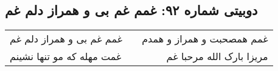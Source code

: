 \begin{center}
\section*{دوبیتی شماره ۹۲: غمم غم بی و همراز دلم غم}
\label{sec:092}
\begin{longtable}{l p{0.5cm} r}
غمم غم بی و همراز دلم غم
&&
غمم همصحبت و همراز و همدم
\\
غمت مهله که مو تنها نشینم
&&
مریزا بارک الله مرحبا غم
\\
\end{longtable}
\end{center}
